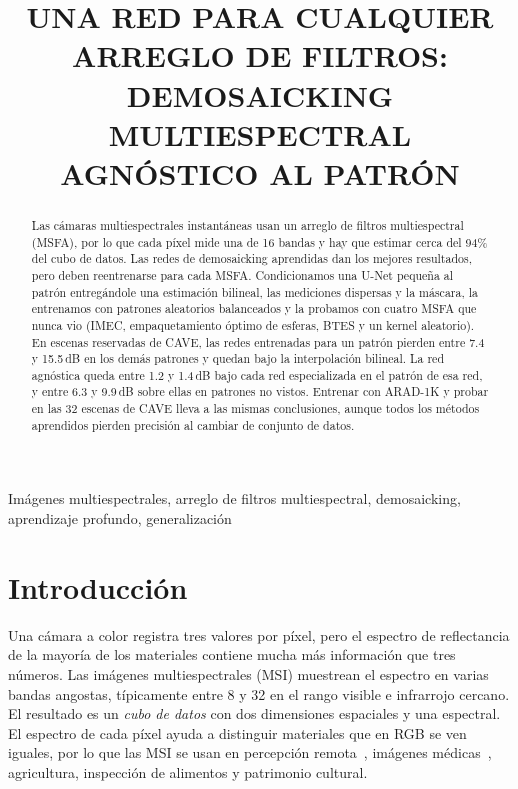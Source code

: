 \documentclass{article}
\title{UNA RED PARA CUALQUIER ARREGLO DE FILTROS:\\
  DEMOSAICKING MULTIESPECTRAL AGNÓSTICO AL PATRÓN}
\begin{document}
%
\maketitle
%
\begin{abstract}
Las cámaras multiespectrales instantáneas usan un arreglo de filtros
multiespectral (MSFA), por lo que cada píxel mide una de 16 bandas y hay que
estimar cerca del 94\% del cubo de datos. Las redes de demosaicking
aprendidas dan los mejores resultados, pero deben reentrenarse para cada
MSFA. Condicionamos una U-Net pequeña al patrón entregándole una estimación
bilineal, las mediciones dispersas y la máscara, la entrenamos con patrones
aleatorios balanceados y la probamos con cuatro MSFA que nunca vio (IMEC,
empaquetamiento óptimo de esferas, BTES y un kernel aleatorio). En escenas
reservadas de CAVE, las redes entrenadas para un patrón pierden entre 7.4 y
15.5\,dB en los demás patrones y quedan bajo la interpolación bilineal. La
red agnóstica queda entre 1.2 y 1.4\,dB bajo cada red especializada en el
patrón de esa red, y entre 6.3 y 9.9\,dB sobre ellas en patrones no vistos.
Entrenar con ARAD-1K y probar en las 32 escenas de CAVE lleva a las mismas
conclusiones, aunque todos los métodos aprendidos pierden precisión al
cambiar de conjunto de datos.
\end{abstract}
%
\begin{keywords}
Imágenes multiespectrales, arreglo de filtros multiespectral, demosaicking,
aprendizaje profundo, generalización
\end{keywords}
%
\section{Introducción}
\label{sec:intro}

Una cámara a color registra tres valores por píxel, pero el espectro de
reflectancia de la mayoría de los materiales contiene mucha más información
que tres números. Las imágenes multiespectrales (MSI) muestrean el espectro
en varias bandas angostas, típicamente entre 8 y 32 en el rango visible e
infrarrojo cercano. El resultado es un \emph{cubo de datos} con dos
dimensiones espaciales y una espectral. El espectro de cada píxel ayuda a
distinguir materiales que en RGB se ven iguales, por lo que las MSI se usan
en percepción remota~\cite{diaz2023}, imágenes médicas~\cite{lu2014},
agricultura, inspección de alimentos y patrimonio cultural.
\end{document}
